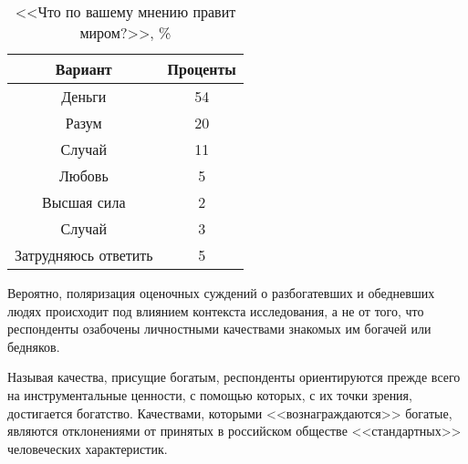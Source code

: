\begin{table}[H]
    \centering
    \begin{tabular}{|c|c|}
        \hline
        Вариант & Проценты \\ \hline \hline
        Деньги & 54 \\ \hline
        Разум & 20 \\ \hline
        Случай & 11 \\ \hline
        Любовь & 5 \\ \hline
        Высшая сила & 2 \\ \hline
        Случай & 3 \\ \hline
        Затрудняюсь ответить & 5 \\ \hline
    \end{tabular}
    \caption{<<Что по вашему мнению правит миром?>>, \%}
\end{table}

Вероятно, поляризация оценочных суждений о разбогатевших и обедневших людях 
происходит под влиянием контекста исследования, а не от того, что респонденты 
озабочены личностными качествами знакомых им богачей или бедняков. 

Называя качества, присущие богатым, респонденты ориентируются прежде всего 
на инструментальные ценности, с помощью которых, с их точки зрения, достигается 
богатство. Качествами, которыми <<вознаграждаются>> богатые, являются 
отклонениями от принятых в российском обществе <<стандартных>> человеческих 
характеристик. 

\newpage

